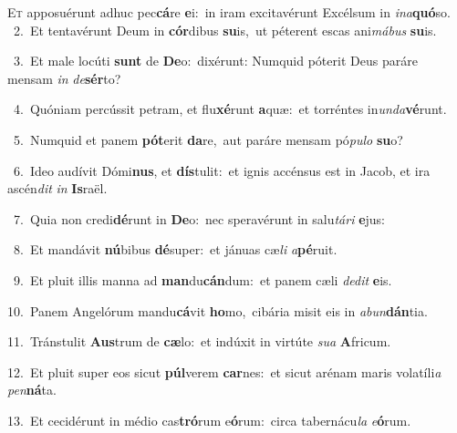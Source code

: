 \lettrine{\initial\textcolor{\initialcolor}{E}}{t} apposuérunt adhuc pec\-\textbf{cá}\-re \textbf{e}\-i:~\star in iram excitavérunt Excélsum in \textit{in}\-\textit{a}\textbf{quó}so.\\
{\numbfont\textcolor{\numbcolor}{~2.}}~Et tentavérunt Deum in \textbf{cór}\-dibus \textbf{su}\-is,~\star ut péterent escas ani\-\textit{má}\-\textit{bus} \textbf{su}\-is.\par
{\numbfont\textcolor{\numbcolor}{~3.}}~Et male locúti \textbf{sunt} de \textbf{De}\-o:~\star dixérunt: Numquid póterit Deus paráre mensam \textit{in} \textit{de}\-\textbf{sér}to?\par
{\numbfont\textcolor{\numbcolor}{~4.}}~Quóniam percússit petram, et flu\-\textbf{xé}\-runt \textbf{a}\-quæ:~\star et torréntes in\-\textit{un}\-\textit{da}\textbf{vé}runt.\par
{\numbfont\textcolor{\numbcolor}{~5.}}~Numquid et panem \textbf{pót}\-erit \textbf{da}\-re,~\star aut paráre mensam pó\-\textit{pu}\-\textit{lo} \textbf{su}\-o?\par
{\numbfont\textcolor{\numbcolor}{~6.}}~Ideo audívit Dómi\-\textbf{nus}\-, et \textbf{dís}\-tulit:~\star et ignis accénsus est in Jacob, et ira ascén\textit{dit} \textit{in} \textbf{Is}\-raël.\par
{\numbfont\textcolor{\numbcolor}{~7.}}~Quia non credi\-\textbf{dé}\-runt in \textbf{De}\-o:~\star nec speravérunt in salu\-\textit{tá}\-\textit{ri} \textbf{e}\-jus:\par
{\numbfont\textcolor{\numbcolor}{~8.}}~Et mandávit \textbf{nú}\-bibus \textbf{dé}\-super:~\star et jánuas cæ\textit{li} \textit{a}\-\textbf{pé}ruit.\par
{\numbfont\textcolor{\numbcolor}{~9.}}~Et pluit illis manna ad \textbf{man}\-du\-\textbf{cán}\-dum:~\star et panem cæli \textit{de}\-\textit{dit} \textbf{e}\-is.\par
{\numbfont\textcolor{\numbcolor}{10.}}~Panem Angelórum mandu\-\textbf{cá}\-vit \textbf{ho}\-mo,~\star cibária misit eis in \textit{ab}\-\textit{un}\textbf{dán}tia.\par
{\numbfont\textcolor{\numbcolor}{11.}}~Tránstulit \textbf{Aus}\-trum de \textbf{cæ}\-lo:~\star et indúxit in virtúte \textit{su}\-\textit{a} \textbf{A}\-fricum.\par
{\numbfont\textcolor{\numbcolor}{12.}}~Et pluit super eos sicut \textbf{púl}\-verem \textbf{car}\-nes:~\star et sicut arénam maris volatíli\textit{a} \textit{pen}\-\textbf{ná}ta.\par
{\numbfont\textcolor{\numbcolor}{13.}}~Et cecidérunt in médio cas\-\textbf{tró}\-rum e\-\textbf{ó}\-rum:~\star circa tabernácu\textit{la} \textit{e}\-\textbf{ó}rum.\par
